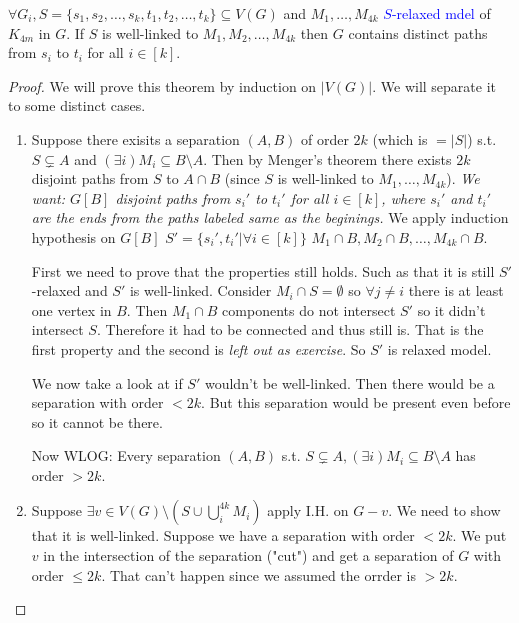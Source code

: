 \begin{thm}[\textcolor{blue}{Slightly changed}]
	$\forall G_{i}, S = \{s_{1}, s_{2}, \dots, s_{k}, t_{1}, t_{2}, \dots, t_{k}\} \subseteq V(G)$ and $M_{1}, \dots, M_{4k}$ \textcolor{blue}{$S$-relaxed mdel} of $K_{4m}$ in $G$. If $S$  is well-linked to $M_{1}, M_{2}, \dots, M_{4k}$ then $G$ contains distinct paths from $s_{i}$ to $t_{i}$ for all $i \in [k]$.
\end{thm}

\begin{proof}
	We will prove this theorem by induction on $|V(G)|$. We will separate it to some distinct cases.
	
	\begin{enumerate}[(1)]
		\item Suppose there exisits a separation $(A,B)$ of order $2k$ (which is $= |S|$) s.t. $S \subsetneq A$ and $(\exists i) M_{i} \subseteq B \setminus A$. Then by Menger's theorem there exists $2k$ disjoint paths from $S$ to $A \cap B$ (since $S$ is well-linked to $M_{1}, \dots, M_{4k}$).\textit{ We want: $G[B]$ disjoint paths from $s_{i}'$ to $t_{i}'$ for all $i \in [k]$, where $s_{i}'$ and $t_{i}'$ are the ends from the paths labeled same as the beginings.} We apply induction hypothesis on $G[B]$ $S' = \{s_{i}', t_{i}' | \forall i \in [k]\}$ $M_{1} \cap B, M_{2} \cap B, \dots, M_{4k} \cap B$.
		
		First we need to prove that the properties still holds. Such as that it is still $S'$-relaxed and $S'$ is well-linked. Consider $M_{i} \cap S = \emptyset$ so $\forall j \neq i$ there is at least one vertex in $B$. Then $M_{1} \cap B$ components do not intersect $S'$ so it didn't intersect $S$. Therefore it had to be connected and thus still is. That is the first property and the second is \textit{left out as exercise}. So $S'$ is relaxed model.
		
		We now take a look at if $S'$ wouldn't be well-linked. Then there would be a separation with order $< 2k$. But this separation would be present even before so it cannot be there.
		
		Now WLOG: Every separation $(A,B)$ s.t. $S \subsetneq A, (\exists i) M_{i} \subseteq B \setminus A$ has order $> 2k$.
		
		\item Suppose $\exists v \in V(G) \setminus (S \cup \bigcup_{i}^{4k} M_{i})$ apply I.H. on $G -v$. We need to show that it is well-linked. Suppose we have a separation with order $<2k$. We put $v$ in the intersection of the separation ("cut") and get a separation of $G$ with order $\leq 2k$. That can't happen since we assumed the orrder is $>2k$.
		

\end{enumerate}
\end{proof}
